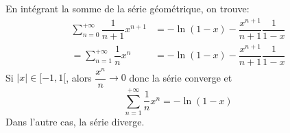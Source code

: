 \documentclass[a4paper, 12pt]{article}
\begin{document}
\begin{demonstration}
    En intégrant la somme de la série géométrique, on trouve:
    \begin{align*}
        \sum\limits_{n=0}^{+\infty}\dfrac{1}{n+1}x^{n+1} &= -\ln(1 - x) - \dfrac{x^{n+1}}{n+1}\dfrac{1}{1 - x}\\
        = \sum\limits_{n=1}^{+\infty}\dfrac{1}{n}x^{n} &= -\ln(1 - x) - \dfrac{x^{n+1}}{n+1}\dfrac{1}{1 - x}
    \end{align*}
    Si $|x| \in [-1, 1[$, alors $\dfrac{x^n}{n} \rightarrow 0$ donc la série converge et
    $$
    \sum\limits_{n=1}^{+\infty}\dfrac{1}{n}x^{n} = -\ln(1 - x)
    $$
    Dans l'autre cas, la série diverge.
\end{demonstration}
\end{document}
